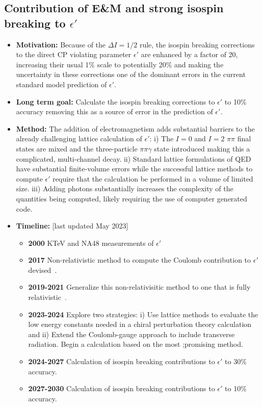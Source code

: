 \documentclass[12pt,hyperpdf]{article}
\begin{document}
\subsection{Contribution of E\&M and strong isospin breaking to $\epsilon'$}
\begin{itemize}
    \item{\bf Motivation:} Because of the $\Delta I=1/2$ rule, the isospin breaking corrections to the direct CP violating parameter $\epsilon'$ are enhanced by a factor of 20, increasing their usual 1\% scale to potentially 20\% and making the uncertainty in these corrections one of the dominant errors in the current standard model prediction of $\epsilon'$.
    \item{\bf Long term goal:} Calculate the isospin breaking corrections to $\epsilon'$ to 10\% accuracy removing this as a source of error in the prediction of $\epsilon'$.
    \item{\bf Method:} The addition of electromagnetism adds substantial barriers to the already challenging lattice calculation of $\epsilon'$:  i) The $I=0$ and $I=2$ $\pi\pi$ final states are mixed and the three-particle $\pi\pi\gamma$ state introduced making this a complicated, multi-channel decay. ii)  Standard lattice formulations of QED have substantial finite-volume errors while the successful lattice methods to compute $\epsilon'$ require that the calculation be performed in a volume of limited size.  iii) Adding photons substantially increases the complexity of the quantities being computed, likely requiring the use of computer generated code.
\item{\bf Timeline:} \hfill [last updated May 2023]
\begin{itemize}
    \item{\bf 2000} KTeV and NA48 measurements of $\epsilon'$
    \item{\bf 2017} Non-relativistic method to compute the Coulomb contribution to $\epsilon'$ devised~\cite{Christ:2017pze}.
    \item{\bf 2019-2021} Generalize this non-relativisitic method to one that is fully relativistic~\cite{Christ:2021guf}.
    \item{\bf 2023-2024} Explore two strategies:  i) Use lattice methods to evaluate the low energy constants needed in a chiral perturbation theory calculation~\cite{Cirigliano:2019cpi} and ii) Extend the Coulomb-gauge approach to include transverse radiation.  Begin a calculation based on the most ;promising method.
    \item{\bf 2024-2027} Calculation of isospin breaking contributions to $\epsilon'$ to 30\% accuracy.
    \item{\bf 2027-2030} Calculation of isospin breaking contributions to $\epsilon'$ to 10\% accuracy.
\end{itemize}
\end{itemize}
\end{document}
